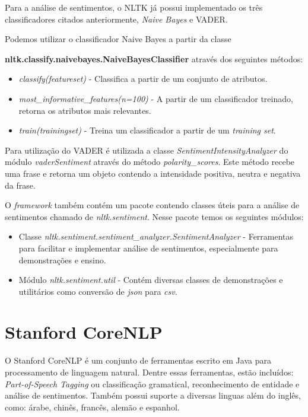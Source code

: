 Para a análise de sentimentos, o \ac{NLTK} já possui implementado os três
classificadores citados anteriormente, \textit{Naive Bayes} e \ac{VADER}.

Podemos utilizar o classificador Naive Bayes a partir da classe

\textbf{nltk.classify.naivebayes.NaiveBayesClassifier} através dos seguintes métodos:

\begin{itemize}
  \item \textit{classify(featureset)} - Classifica a partir de um conjunto de
  atributos.
  \item \textit{most\_informative\_features(n=100)} - A partir de um
  classificador treinado, retorna os atributos mais relevantes.
  \item \textit{train(trainingset)} - Treina um classificador a partir de um \textit{training set}.
\end{itemize}

Para utilização do \ac{VADER} é utilizada a classe
\textit{SentimentIntensityAnalyzer} do módulo \textit{vaderSentiment} através
do método \textit{polarity\_scores}. Este método recebe uma frase e retorna um
objeto contendo a intensidade positiva, neutra e negativa da frase.

O \textit{framework}
também contém um pacote contendo classes úteis para a análise de sentimentos
chamado de \textit{nltk.sentiment}. Nesse pacote temos os seguintes módulos:


\begin{itemize}
  \item Classe \textit{nltk.sentiment.sentiment\_analyzer.SentimentAnalyzer} -
  Ferramentas para facilitar e implementar análise de sentimentos,
  especialmente para demonstrações e ensino.
  \item Módulo \textit{nltk.sentiment.util} - Contém diversas classes de
  demonstrações e utilitários como conversão de \textit{json} para \textit{csv}.
\end{itemize}

\section{Stanford CoreNLP}

O Stanford CoreNLP é um conjunto de ferramentas escrito em Java para
processamento de linguagem natural. Dentre essas ferramentas, estão incluídos:
\textit{Part-of-Speech Tagging} ou classificação gramatical, reconhecimento de
entidade e análise de sentimentos. Também possui suporte a diversas linguas além
do inglês, como: árabe, chinês, francês, alemão e espanhol.

